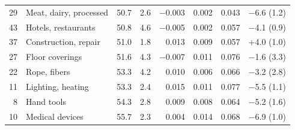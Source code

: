 {\begin{longtable}{r>{\raggedright\arraybackslash}p{3.6cm}rrrrrr}
29 & Meat, dairy, processed & 50.7 & 2.6 & $-$0.003 & 0.002 & 0.043 & $-$6.6 (1.2) \\
43 & Hotels, restaurants & 50.8 & 4.6 & $-$0.005 & 0.002 & 0.057 & $-$4.1 (0.9) \\
37 & Construction, repair & 51.0 & 1.8 & 0.013 & 0.009 & 0.057 & +4.0 (1.0) \\
27 & Floor coverings & 51.6 & 4.3 & $-$0.007 & 0.011 & 0.076 & $-$1.6 (3.3) \\
22 & Rope, fibers & 53.3 & 4.2 & 0.010 & 0.006 & 0.066 & $-$3.2 (2.8) \\
11 & Lighting, heating & 53.3 & 2.4 & 0.015 & 0.011 & 0.077 & $-$5.5 (1.1) \\
8 & Hand tools & 54.3 & 2.8 & 0.009 & 0.008 & 0.064 & $-$5.2 (1.6) \\
10 & Medical devices & 55.7 & 2.3 & 0.004 & 0.014 & 0.068 & $-$6.9 (1.0) \\
\bottomrule\end{longtable}}
